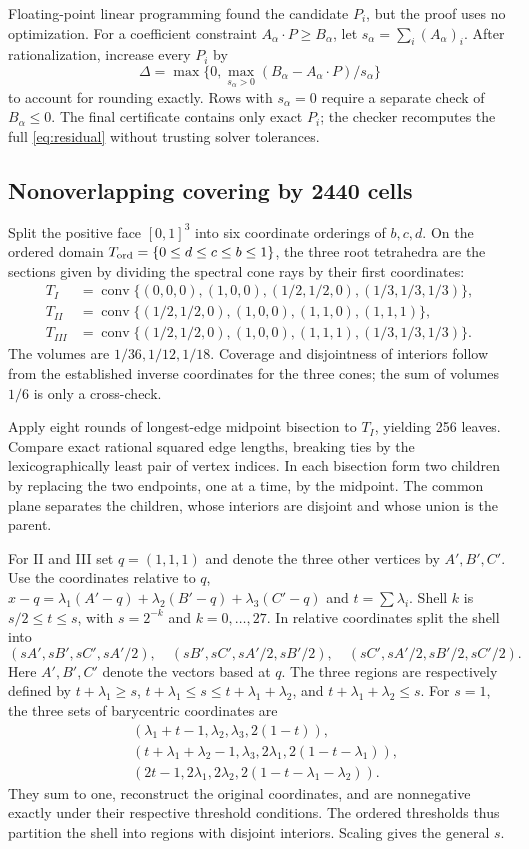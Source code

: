 \documentclass[11pt,a4paper]{article}
\theoremstyle{remark}\newtheorem{remark}[theorem]{Remark}
\newcommand{\1}{\mathbf1}\newcommand{\pos}[1]{(#1)_+}
\DeclareMathOperator{\conv}{conv}\DeclareMathOperator{\Dom}{Dom}
\begin{document}
Floating-point linear programming found the candidate $P_i$, but the proof uses no optimization. For a coefficient constraint $A_\alpha\cdot P\ge B_\alpha$, let $s_\alpha=\sum_i(A_\alpha)_i$. After rationalization, increase every $P_i$ by
\[
 \Delta=\max\{0,\max_{s_\alpha>0}(B_\alpha-A_\alpha\cdot P)/s_\alpha\}
\]
to account for rounding exactly. Rows with $s_\alpha=0$ require a separate check of $B_\alpha\le0$. The final certificate contains only exact $P_i$; the checker recomputes the full \eqref{eq:residual} without trusting solver tolerances.

\subsection{Nonoverlapping covering by 2440 cells}
Split the positive face $[0,1]^3$ into six coordinate orderings of $b,c,d$. On the ordered domain
$T_{\rm ord}=\{0\le d\le c\le b\le1\}$, the three root tetrahedra are the sections given by dividing the spectral cone rays by their first coordinates:
\begin{align*}
 T_I&=\conv\{(0,0,0),(1,0,0),(1/2,1/2,0),(1/3,1/3,1/3)\},\\
 T_{II}&=\conv\{(1/2,1/2,0),(1,0,0),(1,1,0),(1,1,1)\},\\
 T_{III}&=\conv\{(1/2,1/2,0),(1,0,0),(1,1,1),(1/3,1/3,1/3)\}.
\end{align*}
The volumes are $1/36,1/12,1/18$. Coverage and disjointness of interiors follow from the established inverse coordinates for the three cones; the sum of volumes $1/6$ is only a cross-check.

Apply eight rounds of longest-edge midpoint bisection to $T_I$, yielding 256 leaves. Compare exact rational squared edge lengths, breaking ties by the lexicographically least pair of vertex indices. In each bisection form two children by replacing the two endpoints, one at a time, by the midpoint. The common plane separates the children, whose interiors are disjoint and whose union is the parent.

For II and III set $q=(1,1,1)$ and denote the three other vertices by $A',B',C'$. Use the coordinates relative to $q$, $x-q=\lambda_1(A'-q)+\lambda_2(B'-q)+\lambda_3(C'-q)$ and $t=\sum\lambda_i$. Shell $k$ is $s/2\le t\le s$, with $s=2^{-k}$ and $k=0,\ldots,27$. In relative coordinates split the shell into
\[
 (sA',sB',sC',sA'/2),\quad
 (sB',sC',sA'/2,sB'/2),\quad
 (sC',sA'/2,sB'/2,sC'/2).
\]
Here $A',B',C'$ denote the vectors based at $q$. The three regions are respectively defined by
$t+\lambda_1\ge s$, $t+\lambda_1\le s\le t+\lambda_1+\lambda_2$, and $t+\lambda_1+\lambda_2\le s$. For $s=1$, the three sets of barycentric coordinates are
\begin{align*}
 &(\lambda_1+t-1,\lambda_2,\lambda_3,2(1-t)),\\
 &(t+\lambda_1+\lambda_2-1,\lambda_3,2\lambda_1,2(1-t-\lambda_1)),\\
 &(2t-1,2\lambda_1,2\lambda_2,2(1-t-\lambda_1-\lambda_2)).
\end{align*}
They sum to one, reconstruct the original coordinates, and are nonnegative exactly under their respective threshold conditions. The ordered thresholds thus partition the shell into regions with disjoint interiors. Scaling gives the general $s$.
\end{document}
